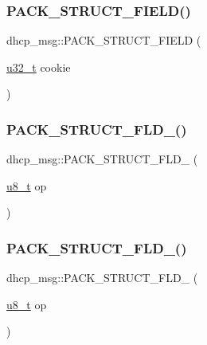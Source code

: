 \subsubsection{\texorpdfstring{P\+A\+C\+K\+\_\+\+S\+T\+R\+U\+C\+T\+\_\+\+F\+I\+E\+L\+D()}{PACK\_STRUCT\_FIELD()}\hspace{0.1cm}{\footnotesize\ttfamily [8/8]}}
{\footnotesize\ttfamily dhcp\+\_\+msg\+::\+P\+A\+C\+K\+\_\+\+S\+T\+R\+U\+C\+T\+\_\+\+F\+I\+E\+LD (\begin{DoxyParamCaption}\item[{\hyperlink{group__compiler__abstraction_ga4c14294869aceba3ef9d4c0c302d0f33}{u32\+\_\+t}}]{cookie }\end{DoxyParamCaption})}

\mbox{\label{structdhcp__msg_a4767f765a467152d48153a7d1f05c5b3}} 
\subsubsection{\texorpdfstring{P\+A\+C\+K\+\_\+\+S\+T\+R\+U\+C\+T\+\_\+\+F\+L\+D\+\_()}{PACK\_STRUCT\_FLD\_8()}\hspace{0.1cm}{\footnotesize\ttfamily [1/16]}}
{\footnotesize\ttfamily dhcp\+\_\+msg\+::\+P\+A\+C\+K\+\_\+\+S\+T\+R\+U\+C\+T\+\_\+\+F\+L\+D\+\_ (\begin{DoxyParamCaption}\item[{\hyperlink{group__compiler__abstraction_ga4caecabca98b43919dd11be1c0d4cd8e}{u8\+\_\+t}}]{op }\end{DoxyParamCaption})}

\mbox{\label{structdhcp__msg_a4767f765a467152d48153a7d1f05c5b3}} 
\subsubsection{\texorpdfstring{P\+A\+C\+K\+\_\+\+S\+T\+R\+U\+C\+T\+\_\+\+F\+L\+D\+\_()}{PACK\_STRUCT\_FLD\_8()}\hspace{0.1cm}{\footnotesize\ttfamily [2/16]}}
{\footnotesize\ttfamily dhcp\+\_\+msg\+::\+P\+A\+C\+K\+\_\+\+S\+T\+R\+U\+C\+T\+\_\+\+F\+L\+D\+\_ (\begin{DoxyParamCaption}\item[{\hyperlink{group__compiler__abstraction_ga4caecabca98b43919dd11be1c0d4cd8e}{u8\+\_\+t}}]{op }\end{DoxyParamCaption})}

